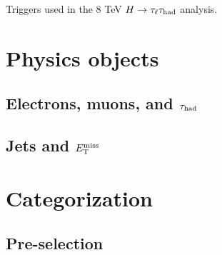 \begin{table}[bp]
  \centering
  \renewcommand{\arraystretch}{1.4}
  \caption{Triggers used in the 8 TeV $H\rightarrow\tau_\ell\tau_\text{had}$ analysis.}
  
  \label{tab:strategy-triggers}
\end{table}

\section{Physics objects}
\label{sec:strategy-objects}

\subsection{Electrons, muons, and $\tau_\text{had}$}
\label{sec:strategy-leptons}

\subsection{Jets and $E_{\mathrm{T}}^{\mathrm{miss}}$}
\label{sec:strategy-hadronic}

\section{Categorization}
\label{sec:strategy-categorization}

\subsection{Pre-selection}
\label{sec:strategy-preselection}

